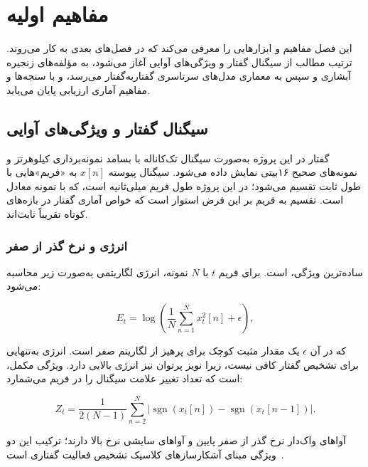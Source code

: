 
\chapter{مفاهیم اولیه}
\label{ch:prelim}

این فصل مفاهیم و ابزارهایی را معرفی می‌کند که در فصل‌های بعدی به کار می‌روند.
ترتیب مطالب از سیگنال گفتار و ویژگی‌های آوایی آغاز می‌شود، به مؤلفه‌های زنجیره
آبشاری و سپس به معماری مدل‌های سرتاسری گفتار‌به‌گفتار می‌رسد، و با سنجه‌ها و
مفاهیم آماری ارزیابی پایان می‌یابد.

\section{سیگنال گفتار و ویژگی‌های آوایی}
\label{sec:features}

گفتار در این پروژه به‌صورت سیگنال تک‌کاناله با بسامد نمونه‌برداری
 کیلوهرتز و نمونه‌های صحیح ۱۶‌بیتی نمایش داده می‌شود. سیگنال پیوسته
$x[n]$ به «فریم»هایی با طول ثابت تقسیم می‌شود؛ در این پروژه طول فریم
 میلی‌ثانیه است، که با  نمونه معادل است. تقسیم به فریم بر این
فرض استوار است که خواص آماری گفتار در بازه‌های کوتاه تقریباً ثابت‌اند.

\subsection{انرژی و نرخ گذر از صفر}

ساده‌ترین ویژگی،  است. برای فریم $t$ با $N$ نمونه، انرژی
لگاریتمی به‌صورت زیر محاسبه می‌شود:

\begin{equation}
E_t = \log\!\left(\frac{1}{N}\sum_{n=1}^{N} x_t^2[n] + \epsilon\right),
\label{eq:energy}
\end{equation}

که در آن $\epsilon$ یک مقدار مثبت کوچک برای پرهیز از لگاریتم صفر است. انرژی
به‌تنهایی برای تشخیص گفتار کافی نیست، زیرا نویز پرتوان نیز انرژی بالایی
دارد. ویژگی مکمل،  است که تعداد تغییر علامت سیگنال را
در فریم می‌شمارد:

\begin{equation}
Z_t = \frac{1}{2(N-1)}\sum_{n=2}^{N}
      \bigl|\operatorname{sgn}(x_t[n]) - \operatorname{sgn}(x_t[n-1])\bigr|.
\label{eq:zcr}
\end{equation}

آواهای واک‌دار نرخ گذر از صفر پایین و آواهای سایشی نرخ بالا دارند؛ ترکیب این
دو ویژگی مبنای آشکارسازهای کلاسیک تشخیص فعالیت گفتاری
است~\cite{sohn1999vad}.

